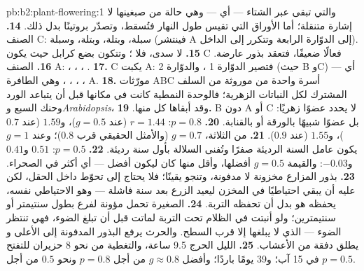 \begin{solution}{pb:b2:plant-flowering:1}
 والتي تبقى عبر الشتاء --- أي  --- وهي
حالة من صبغينها لا إشارة متنقلة؛ أما الأوراق التي
تقيس طول النهار فتُسقط، وتصدّر بروتينًا بدل ذلك.
\textbf{14.} الصنف C: سبلة، وبتلة، وبتلة، وسبلة (فينتشر A إلى
الدوّارة الرابعة وتتكرر  إلى الداخل).
\textbf{15.} لا سدى، فلا ؛ وتتكون بضع كرابل حيث يكون C
فعالًا ضعيفًا، فتعقد بذور عارضة.
\textbf{16.} الصنف A: ، ، ، .
\textbf{17.} C يكبت A: فتصير الدوّارة 1 ، والدوّارة 2 (حيث B وC)
 --- أي ، ، ، ، وهي  الطافرة A.
\textbf{18.} مورّثات ABC أسرة واحدة من 
موروثة من السلف المشترك لكل النباتات الزهرية؛
فالوحدة النمطية كانت في مكانها قبل أن يتباعد الورد وحنك السبع و\emph{Arabidopsis}،
وقد أبقاها كل منها.
\textbf{19.} B دون A أو C لا يحدد عضوًا زهريًا: بل عضوًا شبيهًا
بالورقة أو بالقنابة.
\textbf{20.} $p = 0.8$: $r = 1.44$ (عند $g = 0.5$)، و$1.59$ (عند $0.7$)، و$1.55$
(عند $0.9$).
\textbf{21.} من الثلاثة، $g = 0.7$ (والأمثل الحقيقي قرب
$0.8$)؛ وعند $g = 1$ يكون عامل السنة الرديئة صفرًا وتُفنى السلالة
بأول سنة رديئة.
\textbf{22.} $p = 0.5$: $0.51$ و$0.41$ و$-0.03$: والقيمة $g = 0.5$ أفضلها،
وأقل منها كان ليكون أفضل --- أي  أكثر في الصحراء.
\textbf{23.} بذور المزارع مخزونة لا مدفونة، وتنجو
يقينًا؛ فلا يحتاج إلى تحوّط داخل الحقل، لكن عليه أن يبقي
احتياطيًا في المخزن ليعيد الزرع بعد سنة فاشلة --- وهو
الاحتياطي نفسه، يحفظه هو بدل أن تحفظه التربة.
\textbf{24.}  الصغيرة تحمل مؤونة لفرع بطول
سنتيمتر أو سنتيمترين؛ ولو أنبتت في الظلام تحت التربة لماتت
قبل أن تبلغ الضوء، فهي تنتظر الضوء --- الذي لا يبلغها
إلا قرب السطح. والحرث يرفع البذور المدفونة إلى الأعلى و
يطلق دفقة من الأعشاب.
\textbf{25.} الليل الحرج 9.5 ساعة، والتغطية من نحو 8 حزيران
للتفتح في 15 آب؛ و39 يومًا باردًا؛ وأفضل $g \approx 0.8$ من أجل $p = 0.8$
ونحو $0.5$ من أجل $p = 0.5$.
\end{solution}

